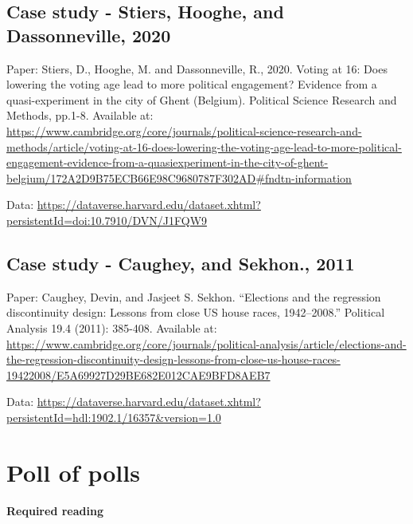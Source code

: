\documentclass[
]{book}
\begin{document}
\hypertarget{case-study---stiers-hooghe-and-dassonneville-2020}{%
\section{Case study - Stiers, Hooghe, and Dassonneville, 2020}\label{case-study---stiers-hooghe-and-dassonneville-2020}}

Paper: Stiers, D., Hooghe, M. and Dassonneville, R., 2020. Voting at 16: Does lowering the voting age lead to more political engagement? Evidence from a quasi-experiment in the city of Ghent (Belgium). Political Science Research and Methods, pp.1-8. Available at: \url{https://www.cambridge.org/core/journals/political-science-research-and-methods/article/voting-at-16-does-lowering-the-voting-age-lead-to-more-political-engagement-evidence-from-a-quasiexperiment-in-the-city-of-ghent-belgium/172A2D9B75ECB66E98C9680787F302AD\#fndtn-information}

Data: \url{https://dataverse.harvard.edu/dataset.xhtml?persistentId=doi:10.7910/DVN/J1FQW9}

\hypertarget{case-study---caughey-and-sekhon.-2011}{%
\section{Case study - Caughey, and Sekhon., 2011}\label{case-study---caughey-and-sekhon.-2011}}

Paper: Caughey, Devin, and Jasjeet S. Sekhon. ``Elections and the regression discontinuity design: Lessons from close US house races, 1942--2008.'' Political Analysis 19.4 (2011): 385-408. Available at: \url{https://www.cambridge.org/core/journals/political-analysis/article/elections-and-the-regression-discontinuity-design-lessons-from-close-us-house-races-19422008/E5A69927D29BE682E012CAE9BFD8AEB7}

Data: \url{https://dataverse.harvard.edu/dataset.xhtml?persistentId=hdl:1902.1/16357\&version=1.0}

\hypertarget{poll-of-polls}{%
\chapter{Poll of polls}\label{poll-of-polls}}

\textbf{Required reading}
\end{document}
